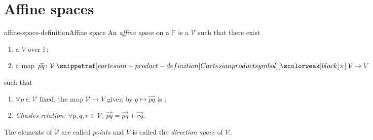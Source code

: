 \documentclass[preview]{standalone}
\begin{document}
\genpage

\section{Affine spaces}


\begin{snippetdefinition}{affine-space-definition}{Affine space}
    An \emph{affine space} on a \field \(\mathbb{F}\) is a \set
    \(\mathcal{V}\) such that there exist 
    \begin{enumerate}
        \item a \vectorspace \(V\) over \(\mathbb{F}\);
        \item a map \(\vec{pq}\colon \mathcal{V} \cartesianprod \mathcal{V} \to V\)
    \end{enumerate}
    such that
    \begin{enumerate}
        \item \(\forall p \in \mathcal{V}\) fixed, the map \(\mathcal{V} \to V\) given by \(q \mapsto \vec{pq}\) is \bijective;
        \item \emph{Chasles relation:} \(\forall p, q, r \in \mathcal{V}\), \(\vec{pq} = \vec{pq} + \vec{rq}\).
    \end{enumerate}
    The elements of \(\mathcal{V}\) are called \emph{points} and \(V\) is called the \emph{direction space} of \(\mathcal{V}\).
\end{snippetdefinition}
\end{document}

